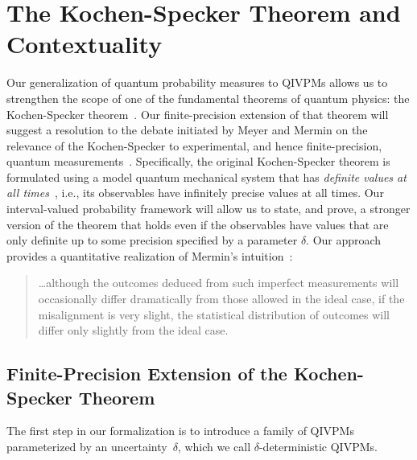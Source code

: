 \documentclass[english,reprint, aps, prl,superscriptaddress, showpacs,
showkeys, longbibliography, amsmath, amssymb, floatfix]{revtex4-1}
\theoremstyle{plain}
\theoremstyle{definition}
\begin{document}
\section{The Kochen-Specker Theorem and Contextuality}
\label{sec:Kochen-Specker}
  
Our generalization of quantum probability measures to QIVPMs allows us
to strengthen the scope of one of the fundamental theorems of quantum
physics: the Kochen-Specker
theorem~\cite{BELL_1966,kochenspecker1967,Redhead1987-REDINA,Mermin1990Simple,peres1995quantum,Jaeger2007,Held2016}. Our
finite-precision extension of that theorem will suggest a resolution
to the debate initiated by Meyer and Mermin on the relevance of the
Kochen-Specker to experimental, and hence finite-precision, quantum
measurements~\cite{PhysRevLett.83.3751,HKSS1999apsrev4,Mermin1999,Kent1999,SimonBruknerZeilinger2001,Cabello2002,Larsson2002,Appleby2002,BarrettKent2004,Appleby_2005,Spekkens2005,GuehneKleinmannCabelloEtAl2010,MazurekPuseyKunjwalEtAl2016}.
Specifically, the original Kochen-Specker theorem is formulated using
a model quantum mechanical system that has \emph{definite values at
  all times}~\cite{Held2016}, i.e., its observables have infinitely
precise values at all times. Our interval-valued probability framework
will allow us to state, and prove, a stronger version of the theorem
that holds even if the observables have values that are only definite
up to some precision specified by a parameter $\delta$. Our approach
provides a quantitative realization of Mermin's
intuition~\cite{Mermin1999}:
\begin{quote}
  \ldots although the outcomes deduced from such imperfect
  measurements will occasionally differ dramatically from those
  allowed in the ideal case, if the misalignment is very slight, the
  statistical distribution of outcomes will differ only slightly from
  the ideal case.
\end{quote}


\subsection{Finite-Precision Extension of the Kochen-Specker Theorem}

The first step in our formalization is to introduce a family of QIVPMs
parameterized by an uncertainty~$\delta$, which we call
$\delta$-deterministic QIVPMs.
\end{document}

